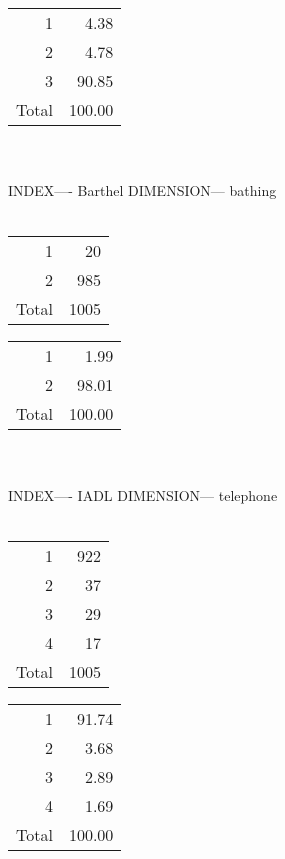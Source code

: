 \documentclass[11pt]{article}
\begin{document}
% 
\begin{tabular}{rr}
   \hline
1 & 4.38 \\ 
  2 & 4.78 \\ 
  3 & 90.85 \\ 
  Total & 100.00 \\ 
   \hline
\end{tabular}
\\\\ 
INDEX---- Barthel DIMENSION--- bathing 
 \\\\ 
% 
\begin{tabular}{rr}
   \hline
1 &  20 \\ 
  2 & 985 \\ 
  Total & 1005 \\ 
   \hline
\end{tabular}
% 
\begin{tabular}{rr}
   \hline
1 & 1.99 \\ 
  2 & 98.01 \\ 
  Total & 100.00 \\ 
   \hline
\end{tabular}
\\\\ 
INDEX---- IADL DIMENSION--- telephone 
 \\\\ 
% 
\begin{tabular}{rr}
   \hline
1 & 922 \\ 
  2 &  37 \\ 
  3 &  29 \\ 
  4 &  17 \\ 
  Total & 1005 \\ 
   \hline
\end{tabular}
% 
\begin{tabular}{rr}
   \hline
1 & 91.74 \\ 
  2 & 3.68 \\ 
  3 & 2.89 \\ 
  4 & 1.69 \\ 
  Total & 100.00 \\ 
   \hline
\end{tabular}
\\\\ 
\end{document}
